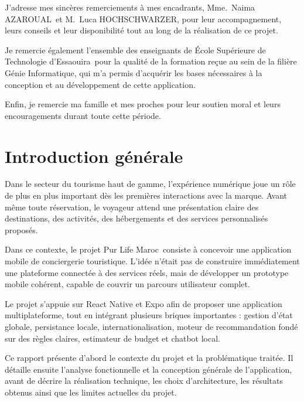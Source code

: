 \documentclass[12pt,a4paper]{report}
\newcommand{\SchoolName}{École Supérieure de Technologie d'Essaouira}
\newcommand{\ProgramName}{Génie Informatique}
\newcommand{\SupervisorOne}{Mme.\ Naima AZAROUAL}
\newcommand{\SupervisorTwo}{M.\ Luca HOCHSCHWARZER}
\newcommand{\ShortProjectName}{Pur Life Maroc}
\begin{document}
J'adresse mes sincères remerciements à mes encadrants, \SupervisorOne\ et \SupervisorTwo, pour leur accompagnement, leurs conseils et leur disponibilité tout au long de la réalisation de ce projet.

Je remercie également l'ensemble des enseignants de \SchoolName\ pour la qualité de la formation reçue au sein de la filière \ProgramName, qui m'a permis d'acquérir les bases nécessaires à la conception et au développement de cette application.

Enfin, je remercie ma famille et mes proches pour leur soutien moral et leurs encouragements durant toute cette période.

\tableofcontents
\newpage
\listoffigures
\newpage

\chapter*{Introduction générale}

Dans le secteur du tourisme haut de gamme, l'expérience numérique joue un rôle de plus en plus important dès les premières interactions avec la marque. Avant même toute réservation, le voyageur attend une présentation claire des destinations, des activités, des hébergements et des services personnalisés proposés.

Dans ce contexte, le projet \ShortProjectName\ consiste à concevoir une application mobile de conciergerie touristique. L'idée n'était pas de construire immédiatement une plateforme connectée à des services réels, mais de développer un prototype mobile cohérent, capable de couvrir un parcours utilisateur complet.

Le projet s'appuie sur React Native et Expo afin de proposer une application multiplateforme, tout en intégrant plusieurs briques importantes : gestion d'état globale, persistance locale, internationalisation, moteur de recommandation fondé sur des règles claires, estimateur de budget et chatbot local.

Ce rapport présente d'abord le contexte du projet et la problématique traitée. Il détaille ensuite l'analyse fonctionnelle et la conception générale de l'application, avant de décrire la réalisation technique, les choix d'architecture, les résultats obtenus ainsi que les limites actuelles du projet.
\end{document}
